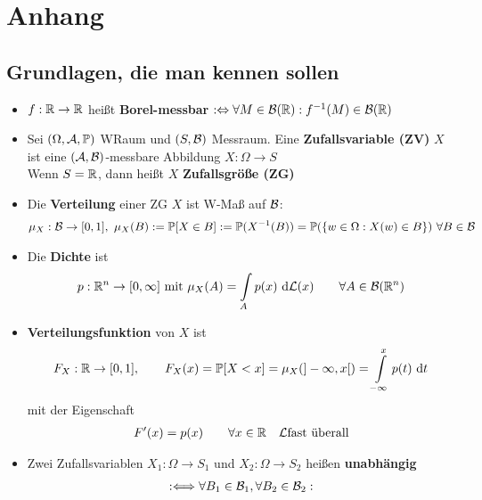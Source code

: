 
\setcounter{chapter}{0}
\renewcommand{\thechapter}{\Alph{chapter}}
\chapter{Anhang}
\setcounter{equation}{1}
\section{Grundlagen, die man kennen sollen}
\begin{itemize}
\item $f:\mathbb{R}\to\mathbb{R}$ heißt \textbf{Borel-messbar} $:\Leftrightarrow\forall M\in\mathcal{B}(\mathbb{R}):f^{-1}(M)\in\mathcal{B}(\mathbb{R})$
\item Sei $(\Omega,\mathcal{A}, \mathbb{P})$ WRaum und $(S,\mathcal{B})$ Messraum. Eine \textbf{Zufallsvariable (ZV)} $X$ ist eine $(\mathcal{A},\mathcal{B})$-messbare Abbildung $X:\Omega\to S$\\
Wenn $S=\mathbb{R}$, dann heißt $X$ \textbf{Zufallsgröße (ZG)}
\item Die \textbf{Verteilung} einer ZG $X$ ist W-Maß auf $\mathcal{B}$:
\begin{align*}
\mu_X:\mathcal{B}\to[0,1],~
\mu_X(B):=\mathbb{P}[X\in B]:=\mathbb{P}(X^{-1}(B))=\mathbb{P}(\lbrace w\in\Omega:X(w)\in B\rbrace)~\forall B\in\mathcal{B}
\end{align*}
\item Die \textbf{Dichte} ist
\begin{align*}
p:\mathbb{R}^n\to[0,\infty]\text{ mit } \mu_X(A)=\int\limits_A p(x)\text{ d}\mathcal{L}(x)\qquad\forall A\in\mathcal{B}(\mathbb{R}^n)
\end{align*}
\item \textbf{Verteilungsfunktion} von $X$ ist
\begin{align*}
F_X:\mathbb{R}\to[0,1],\qquad F_X(x)=\mathbb{P}[X<x]=\mu_X(]-\infty,x[)=\int\limits_{-\infty}^x p(t)\text{ d} t
\end{align*}
mit der Eigenschaft
\begin{align*}
F'(x)=p(x)\qquad\forall x\in\mathbb{R}~~~\mathcal{L}\text{fast überall}
\end{align*}
\item Zwei Zufallsvariablen $X_1:\Omega\to S_1$ und $X_2:\Omega\to S_2$ heißen \textbf{unabhängig} 
\begin{align*}
:\Longleftrightarrow
\forall B_1\in\B_1,\forall B_2\in\B_2:\\

\end{align*}
\end{itemize}
